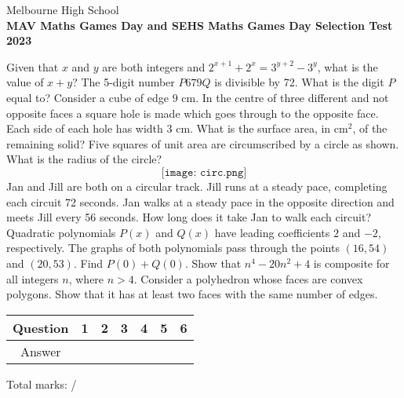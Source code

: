 \documentclass[a4paper,addpoints,11pt]{exam}
\begin{document}
\noindent Melbourne High School\\
\noindent \textbf{MAV Maths Games Day and SEHS Maths Games Day Selection Test 2023}\\

\begin{center}
  {}
  \end{center}
\vspace{5mm}

\begin{questions}
\question[2] Given that $x$ and $y$ are both integers and $2^{x+1}+2^x=3^{y+2}-3^y$, what is the value of $x+y$?   
\question[2] The 5-digit number $P679Q$ is divisible by 72. What is the digit $P$ equal to?   
\question[2] Consider a cube of edge $9$ cm. In the centre of three different and not opposite faces a square hole is made which goes through to the opposite face. Each side of each hole has width $3$ cm. What is the surface area, in cm$^2$, of the remaining solid?   
\question[3] Five squares of unit area are circumscribed by a circle as shown. What is the radius of the circle?   \[{\texttt{[image: circ.png]}}\]
\question[3] Jan and Jill are both on a circular track.  Jill runs at a steady pace, completing each circuit 72 seconds.  Jan walks at a steady pace in the opposite direction and meets Jill every 56 seconds. How long does it take Jan to walk each circuit?
\question[3] Quadratic polynomials \(P(x)\) and \(Q(x)\) have leading
coefficients \(2\) and \(-2\), respectively. The graphs of both polynomials
pass through the points \((16,54)\) and \((20,53)\). Find \(P(0)+Q(0)\).
\question[4] Show that $n^4-20n^2+4$ is composite for all integers $n$, where $n>4$.    
\question[5] Consider a polyhedron whose faces are convex polygons. Show that it has at least two faces with the same number of edges.
\end{questions}
\medskip
\bgroup
\def\arraystretch{1.5}
\setlength\tabcolsep{7mm}
  \begin{center}
    \begin{tabular}{|c|c|c|c|c|c|c|}
      \hline Question&1\quad&2\quad&3\quad&4\quad&5\quad&6\quad\\
      \hline Answer&\quad &\quad &\quad &\quad &\quad &\quad \\
      \hline
    \end{tabular}
  \end{center}
  \egroup
  \medskip
Total marks: \qquad/\numpoints
\end{document}
